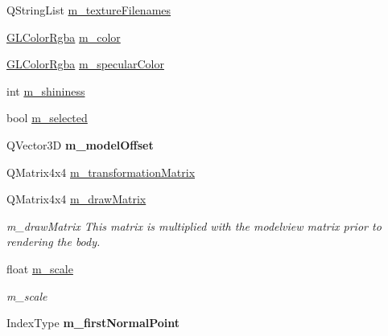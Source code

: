 \begin{DoxyCompactItemize}
\item 
Q\+String\+List \mbox{\hyperlink{class_g_l_body_a51eed96c1bc0d06742d7a9ab455d527d}{m\+\_\+texture\+Filenames}}
\item 
\mbox{\hyperlink{class_g_l_color_rgba}{G\+L\+Color\+Rgba}} \mbox{\hyperlink{class_g_l_body_a267b5c0fbe5752370197012975663dca}{m\+\_\+color}}
\item 
\mbox{\hyperlink{class_g_l_color_rgba}{G\+L\+Color\+Rgba}} \mbox{\hyperlink{class_g_l_body_ac9db9ed4eb8ca1fbf3e4113c530b92af}{m\+\_\+specular\+Color}}
\item 
int \mbox{\hyperlink{class_g_l_body_a4e6949c8876ffe0bc4fddddfa4dd6c9b}{m\+\_\+shininess}}
\item 
bool \mbox{\hyperlink{class_g_l_body_aa98197c0f7376b5afa58302eb96cb05e}{m\+\_\+selected}}
\item 
\mbox{\label{class_g_l_body_a8b2d358664d9cac307bee8ba6709b73a}} 
Q\+Vector3D {\bfseries m\+\_\+model\+Offset}
\item 
Q\+Matrix4x4 \mbox{\hyperlink{class_g_l_body_a38b323efc7e55b6c770638cd108c2143}{m\+\_\+transformation\+Matrix}}
\item 
\mbox{\label{class_g_l_body_afd247051378cdf8d444cb7af288cb012}} 
Q\+Matrix4x4 \mbox{\hyperlink{class_g_l_body_afd247051378cdf8d444cb7af288cb012}{m\+\_\+draw\+Matrix}}
\begin{DoxyCompactList}\small\item\em m\+\_\+draw\+Matrix This matrix is multiplied with the modelview matrix prior to rendering the body. \end{DoxyCompactList}\item 
\mbox{\label{class_g_l_body_a82266ebb17e8932521180ca9626c314c}} 
float \mbox{\hyperlink{class_g_l_body_a82266ebb17e8932521180ca9626c314c}{m\+\_\+scale}}
\begin{DoxyCompactList}\small\item\em m\+\_\+scale \end{DoxyCompactList}\item 
\mbox{\label{class_g_l_body_a790f0028b0ad3c1e08a9c7314fbb91ea}} 
Index\+Type {\bfseries m\+\_\+first\+Normal\+Point}
\item 
\mbox{\label{class_g_l_body_a43978300a750a5c67e474a576ac3ad3c}} 

\end{DoxyCompactItemize}
